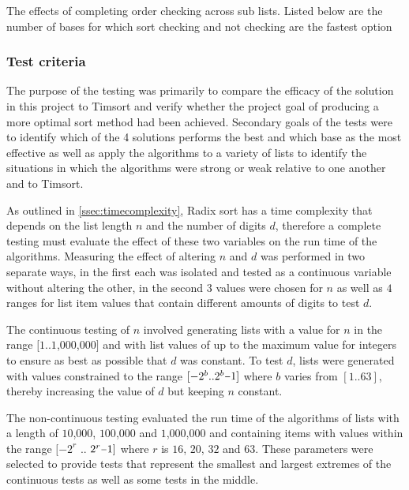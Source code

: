 \documentclass[12pt]{article}
\newcommand{\minus}{\scalebox{0.75}[1.0]{$-$}}
\begin{document}
\begin{table}[h]
	\centering
	\caption{The effects of completing order checking across sub lists. Listed below are the number of bases for which sort checking and not checking are the fastest option}
	
\end{table}

	\pagebreak
	\subsubsection{Test criteria}
	The purpose of the testing was primarily to compare the efficacy of the solution in this project to Timsort and verify whether the project goal of producing a more optimal sort method had been achieved. Secondary goals of the tests were to identify which of the 4 solutions performs the best and which base as the most effective as well as apply the algorithms to a variety of lists to identify the situations in which the algorithms were strong or weak relative to one another and to Timsort.
	\par
	As outlined in \ref{ssec:timecomplexity}, Radix sort has a time complexity that depends on the list length $n$ and the number of digits $d$, therefore a complete testing must evaluate the effect of these two variables on the run time of the algorithms. Measuring the effect of altering $n$ and $d$ was performed in two separate ways, in the first each was isolated and tested as a continuous variable without altering the other, in the second $3$ values were chosen for $n$ as well as $4$ ranges for list item values that contain different amounts of digits to test $d$. 
	\par
	The continuous testing of $n$ involved generating lists with a value for $n$ in the range $[1..1$,$000$,$000]$ and with list values of up to the maximum value for integers to ensure as best as possible that $d$ was constant. To test $d$, lists were generated with values constrained to the range $[-2^b..2^b\minus1]$ where $b$ varies from $[1..63]$, thereby increasing the value of $d$ but keeping $n$ constant.
	\par
	The non-continuous testing evaluated the run time of the algorithms of lists with a length of $10$,$000$, $100$,$000$ and $1$,$000$,$000$ and containing items with values within the range $[-2^{r}$ $..$ $2^{r}\minus1]$ where $r$ is $16$, $20$, $32$ and $63$. These parameters were selected to provide tests that represent the smallest and largest extremes of the continuous tests as well as some tests in the middle. 
\end{document}
